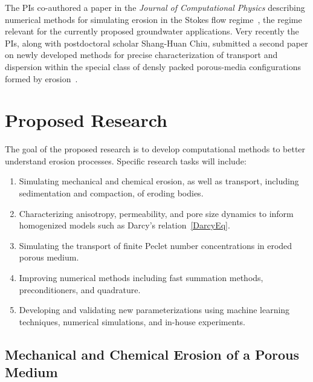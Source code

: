 \documentclass[11pt]{article}
\begin{document}
The PIs co-authored a paper in the {\em Journal of Computational Physics} describing numerical methods for simulating erosion in the Stokes flow regime~\cite{Quaife2018}, the regime relevant for the currently proposed groundwater applications. Very recently the PIs, along with postdoctoral scholar Shang-Huan Chiu, submitted a second paper on newly developed methods for precise characterization of transport and dispersion within the special class of densly packed porous-media configurations formed by erosion~\cite{chi-moo-qua2019}.

\section{Proposed Research} 
The goal of the proposed research is to develop computational methods to better understand erosion processes. Specific research tasks will include:
\begin{enumerate}[noitemsep,label=(\arabic*)]
  \item Simulating mechanical and chemical erosion, as well as transport, including sedimentation and compaction, of eroding bodies.

  \item Characterizing anisotropy, permeability, and pore size dynamics to inform homogenized models such as Darcy's relation~\eqref{DarcyEq}.

  \item Simulating the transport of finite Peclet number concentrations in eroded porous medium.

  \item Improving numerical methods including fast summation methods, preconditioners, and quadrature.  
  
  \item Developing and validating new parameterizations using machine learning techniques, numerical simulations, and in-house experiments.

\end{enumerate}



\subsection{Mechanical and Chemical Erosion of a Porous Medium}
\end{document}
